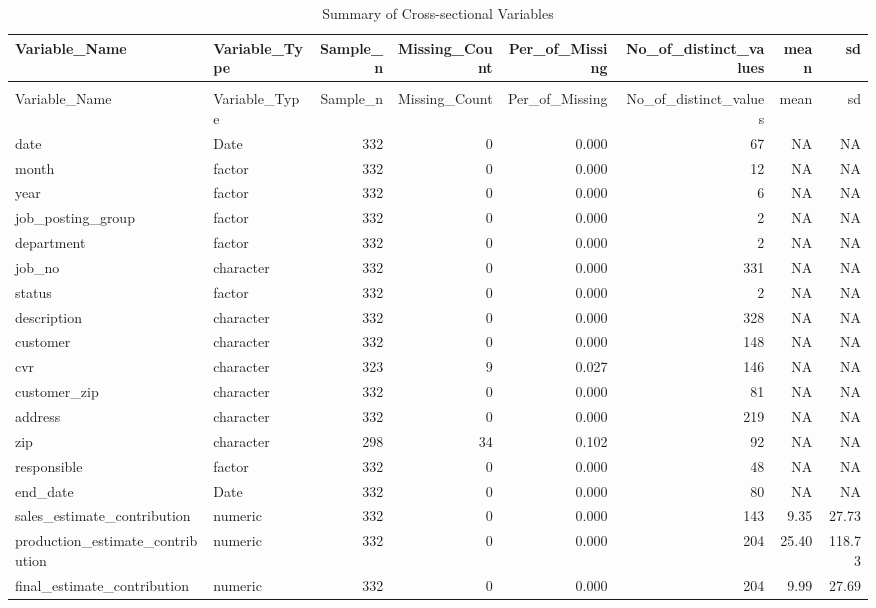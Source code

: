 \begingroup\fontsize{9}{11}\selectfont

\begin{landscape}
\begin{longtable}[t]{llrrrrrr}
\caption{Summary of Cross-sectional Variables}\\
\toprule
Variable\_Name & Variable\_Type & Sample\_n & Missing\_Count & Per\_of\_Missing & No\_of\_distinct\_values & mean & sd\\
\midrule
\endfirsthead
\caption[]{Summary of Cross-sectional Variables }\\
\toprule
Variable\_Name & Variable\_Type & Sample\_n & Missing\_Count & Per\_of\_Missing & No\_of\_distinct\_values & mean & sd\\
\midrule
\endhead

\endfoot
\bottomrule
\endlastfoot
date & Date & 332 & 0 & 0.000 & 67 & NA & NA\\
month & factor & 332 & 0 & 0.000 & 12 & NA & NA\\
year & factor & 332 & 0 & 0.000 & 6 & NA & NA\\
job\_posting\_group & factor & 332 & 0 & 0.000 & 2 & NA & NA\\
department & factor & 332 & 0 & 0.000 & 2 & NA & NA\\
job\_no & character & 332 & 0 & 0.000 & 331 & NA & NA\\
status & factor & 332 & 0 & 0.000 & 2 & NA & NA\\
description & character & 332 & 0 & 0.000 & 328 & NA & NA\\
customer & character & 332 & 0 & 0.000 & 148 & NA & NA\\
cvr & character & 323 & 9 & 0.027 & 146 & NA & NA\\
customer\_zip & character & 332 & 0 & 0.000 & 81 & NA & NA\\
address & character & 332 & 0 & 0.000 & 219 & NA & NA\\
zip & character & 298 & 34 & 0.102 & 92 & NA & NA\\
responsible & factor & 332 & 0 & 0.000 & 48 & NA & NA\\
end\_date & Date & 332 & 0 & 0.000 & 80 & NA & NA\\
sales\_estimate\_contribution & numeric & 332 & 0 & 0.000 & 143 & 9.35 & 27.73\\
production\_estimate\_contribution & numeric & 332 & 0 & 0.000 & 204 & 25.40 & 118.73\\
final\_estimate\_contribution & numeric & 332 & 0 & 0.000 & 204 & 9.99 & 27.69\\

\end{longtable}
\end{landscape}
